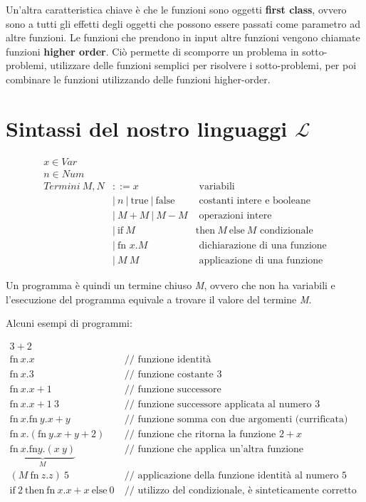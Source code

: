 Un'altra caratteristica chiave è che le funzioni sono oggetti \textbf{first class}, ovvero sono a tutti gli effetti degli oggetti che possono essere passati come parametro ad altre funzioni. 
Le funzioni che prendono in input altre funzioni vengono chiamate funzioni \textbf{higher order}.
Ciò permette di scomporre un problema in sotto-problemi, utilizzare delle funzioni semplici per risolvere i sotto-problemi, per poi combinare le funzioni utilizzando delle funzioni higher-order.

\section{Sintassi del nostro linguaggi $\mathcal{L}$}

\begin{align*}
	x \in Var & &\\
	n \in Num & &\\
	Termini \: M, N &::= x &\text{ variabili} \\
								&|\: n \:|\: \text{true} \:|\: \text{false} &\text{ costanti intere e booleane} \\
								&|\: M + M \:|\: M - M &\text{ operazioni intere} \\
								&|\: \text{if} \: M \: &\text{then} \: M \: \text{else} \: M \text{ condizionale} \\
								&|\: \text{fn } x.M &\text{ dichiarazione di una funzione} \\
								&|\: M \: M &\text{ applicazione di una funzione}
\end{align*}

Un programma è quindi un termine chiuso \textit{M}, ovvero che non ha variabili e l'esecuzione del programma equivale a trovare il valore del termine \textit{M}.

Alcuni esempi di programmi:

\begin{align*}
3 + 2 &\\
\text{fn} \:  x.x &\:\text{// funzione identità} \\
\text{fn} \: x.3 &\: \text{// funzione costante 3} \\
\text{fn} \: x.x+1 &\: \text{// funzione successore} \\
\text{fn} \: x.x+1 \: 3 &\: \text{// funzione successore applicata al numero 3} \\
\text{fn} \: x.\text{fn} \: y . x+y &\: \text{// funzione somma con due argomenti (currificata)} \\
\text{fn} \: x. (\text{fn} \: y . x+y   + 2) &\: \text{// funzione che ritorna la funzione $2+x$} \\
\underbrace{\text{fn} \: x.\text{fn} y.(x\: y)}_{M} &\: \text{// funzione che applica un'altra funzione} \\
(M \: \text{fn} \: z.z) \: 5 &\: \text{// applicazione della funzione identità al numero 5} \\
\text{if} \: 2 \: \text{then} \: \text{fn}\: x.x+x \: \text{else} \: 0 &\: \text{// utilizzo del condizionale, è sinteticamente corretto ma non a livello di tipi}
\end{align*}

